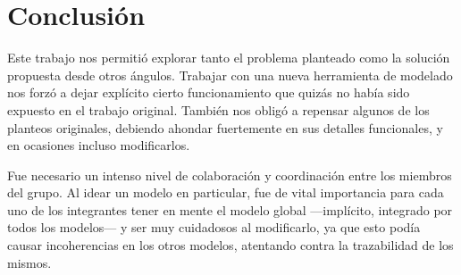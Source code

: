 \section{Conclusión}

Este trabajo nos permitió explorar tanto el problema planteado como la solución propuesta desde otros ángulos. Trabajar con una nueva herramienta de modelado nos forzó a dejar explícito cierto funcionamiento que quizás no había sido expuesto en el trabajo original. También nos obligó a repensar algunos de los planteos originales, debiendo ahondar fuertemente en sus detalles funcionales, y en ocasiones incluso modificarlos.

Fue necesario un intenso nivel de colaboración y coordinación entre los miembros del grupo. Al idear un modelo en particular, fue de vital importancia para cada uno de los integrantes tener en mente el modelo global —implícito, integrado por todos los modelos— y ser muy cuidadosos al modificarlo, ya que esto podía causar incoherencias en los otros modelos, atentando contra la trazabilidad de los mismos.
